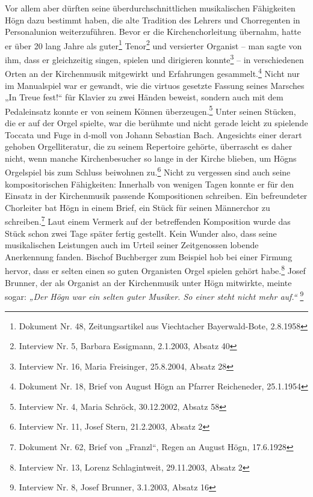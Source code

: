 \documentclass[a4paper]{article}
\newcommand\textstyleZitate[1]{\textit{#1}}
\begin{document}
Vor allem aber dürften seine überdurchschnittlichen musikalischen
Fähigkeiten Högn dazu bestimmt haben, die alte Tradition des Lehrers
und Chorregenten in Personalunion weiterzuführen. Bevor er die
Kirchenchorleitung übernahm, hatte er über 20 lang Jahre als
guter\footnote{ Dokument Nr. 48, Zeitungsartikel aus Viechtacher
Bayerwald-Bote, 2.8.1958} Tenor\footnote{ Interview Nr. 5, Barbara
Essigmann, 2.1.2003, Absatz 40} und versierter Organist – man sagte von
ihm, dass er gleichzeitig singen, spielen und dirigieren
konnte\footnote{ Interview Nr. 16, Maria Freisinger, 25.8.2004, Absatz
28} – in verschiedenen Orten an der Kirchenmusik mitgewirkt und
Erfahrungen gesammelt.\footnote{ Dokument Nr. 18, Brief von August Högn
an Pfarrer Reicheneder, 25.1.1954} Nicht nur im Manualspiel war er
gewandt, wie die virtuos gesetzte Fassung seines Marsches „In Treue
fest!“ für Klavier zu zwei Händen beweist, sondern auch mit dem
Pedaleinsatz konnte er von seinem Können überzeugen.\footnote{
Interview Nr. 4, Maria Schröck, 30.12.2002, Absatz 58} Unter seinen
Stücken, die er auf der Orgel spielte, war die berühmte und nicht
gerade leicht zu spielende Toccata und Fuge in d-moll von Johann
Sebastian Bach. Angesichts einer derart gehoben Orgelliteratur, die zu
seinem Repertoire gehörte, überrascht es daher nicht, wenn manche
Kirchenbesucher so lange in der Kirche blieben, um Högns Orgelspiel bis
zum Schluss beiwohnen zu.\footnote{ Interview Nr. 11, Josef Stern,
21.2.2003, Absatz 2} Nicht zu vergessen sind auch seine
kompositorischen Fähigkeiten: Innerhalb von wenigen Tagen konnte er für
den Einsatz in der Kirchenmusik passende Kompositionen schreiben. Ein
befreundeter Chorleiter bat Högn in einem Brief, ein Stück für seinen
Männerchor zu schreiben.\footnote{ Dokument Nr. 62, Brief von „Franzl“,
Regen an August Högn, 17.6.1928} Laut einem Vermerk auf der
betreffenden Komposition wurde das Stück schon zwei Tage später fertig
gestellt. Kein Wunder also, dass seine musikalischen Leistungen auch im
Urteil seiner Zeitgenossen lobende Anerkennung fanden. Bischof
Buchberger zum Beispiel hob bei einer Firmung hervor, dass er selten
einen so guten Organisten Orgel spielen gehört habe.\footnote{
Interview Nr. 13, Lorenz Schlagintweit, 29.11.2003, Absatz 2} Josef
Brunner, der als Organist an der Kirchenmusik unter Högn mitwirkte,
meinte sogar: \textstyleZitate{„Der Högn war ein selten guter Musiker.
So einer steht nicht mehr auf.“ }\footnote{ Interview Nr. 8, Josef
Brunner, 3.1.2003, Absatz 16} 
\end{document}
